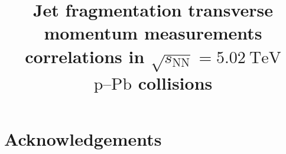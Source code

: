 \documentclass[ALICE,manyauthors]{cernphprep}
\newcommand{\pp}{\ensuremath{\mbox{p\kern-0.05em p}}}
\newcommand{\pPb}{\ensuremath{\mbox{p--Pb}}}
\newcommand{\sqrtS}{\ensuremath{\sqrt{s}}}
\newcommand{\sqrtSnn}{\ensuremath{\sqrt{s_{\mathrm{NN}}}}}
\newcommand{\sqrtSE}[2][TeV]{\ensuremath{\sqrtS = #2~\mathrm{#1}}}
\newcommand{\sqrtSnnE}[2][TeV]{\ensuremath{\sqrtSnn = #2~\mathrm{#1}}}
\newcommand{\GeVc}{\ensuremath{\mathrm{GeV}\kern-0.05em/\kern-0.02em c}}
\def\pt#1{\ensuremath{p_{\rm T#1}}}
\def\jt#1{\ensuremath{j_{\rm T#1}}}
\begin{document}
\begin{titlepage}
%
%

\title{Jet fragmentation transverse momentum measurements correlations in $\sqrtSnnE{5.02}$ $\pPb$ collisions}


\begin{abstract}
\end{abstract}
\end{titlepage}
\setcounter{page}{2}

 


\newenvironment{acknowledgement}{\relax}{\relax}
\begin{acknowledgement}
\section*{Acknowledgements}
\end{acknowledgement}
\end{document}
